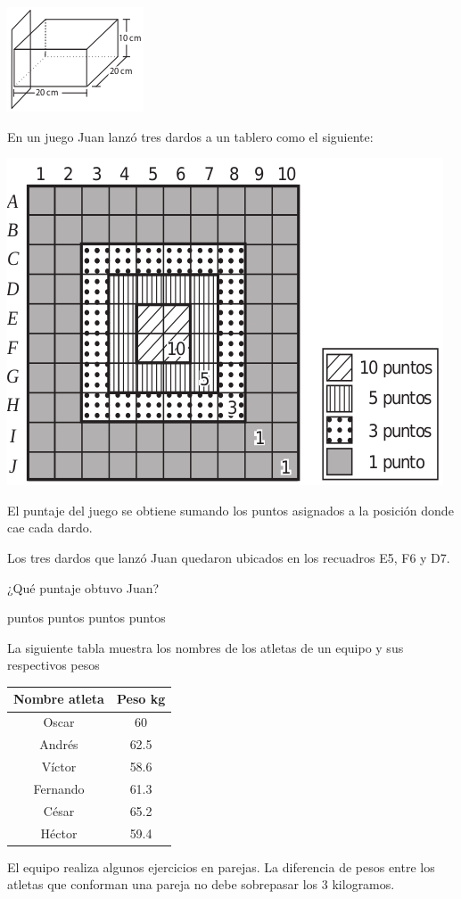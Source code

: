 \documentclass[addpoints]{exam}
\begin{document}
\begin{multicols}{2}
\begin{questions}
\begin{choices}
\choice \includegraphics[scale=.35]{Images/Pantallazo-39.png} 
\end{choices}
\question En un juego Juan lanzó tres dardos a un tablero como el siguiente:
\begin{center}
\includegraphics[scale=.3]{Images/juego_dados.png} 
\end{center}
El puntaje del juego se obtiene sumando los puntos asignados a la posición donde cae cada dardo.

Los tres dardos que lanzó Juan quedaron ubicados en los recuadros E5, F6 y D7.

¿Qué puntaje obtuvo Juan?

\begin{oneparchoices}
 puntos
 puntos
 puntos
 puntos
\end{oneparchoices}
\question La siguiente tabla muestra los nombres de los atletas de un equipo y sus respectivos pesos
\begin{center}
\begin{tabular}[scale=.75]{|c|c|}
\hline 
\textbf{Nombre atleta} & \textbf{Peso kg} \\ 
\hline 
Oscar & 60 \\ 
\hline 
Andrés & 62.5 \\ 
\hline 
Víctor & 58.6 \\ 
\hline 
Fernando & 61.3 \\ 
\hline 
César & 65.2 \\ 
\hline 
Héctor & 59.4 \\ 
\hline 
\end{tabular} 
\end{center}
El equipo realiza algunos ejercicios en parejas. La diferencia de pesos entre los atletas que conforman una pareja no debe sobrepasar los 3 kilogramos.


\end{questions}
\end{multicols}
\end{document}
